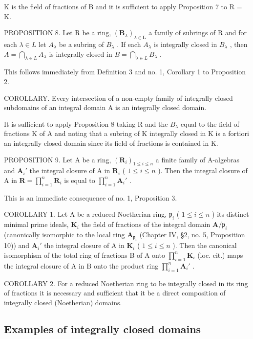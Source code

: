 K is the field of fractions of B and it is sufficient to apply Proposition 7 to R = K.

PROPOSITION 8. Let R be a ring, \((\mathbf{B}_{\lambda})_{\lambda \in \mathbf{L}}\) a family of subrings of R and for each \(\lambda \in L\) let \(A_{\lambda}\) be a subring of \(B_{\lambda}\) . If each \(A_{\lambda}\) is integrally closed in \(B_{\lambda}\) , then \(A = \bigcap_{\lambda \in L} A_{\lambda}\) is integrally closed in \(B = \bigcap_{\lambda \in L} B_{\lambda}\) .

This follows immediately from Definition 3 and no. 1, Corollary 1 to Proposition 2.

COROLLARY. Every intersection of a non-empty family of integrally closed subdomains of an integral domain A is an integrally closed domain.

It is sufficient to apply Proposition 8 taking R and the \(B_{\lambda}\) equal to the field of fractions K of A and noting that a subring of K integrally closed in K is a fortiori an integrally closed domain since its field of fractions is contained in K.

PROPOSITION 9. Let A be a ring, \((\mathbf{R}_i)_{1 \leqslant i \leqslant n}\) a finite family of A-algebras and \(\mathbf{A}_i'\) the integral closure of A in \(\mathbf{R}_i\) ( \(1 \leqslant i \leqslant n\) ). Then the integral closure of A in \(\mathbf{R} = \prod_{i=1}^{n} \mathbf{R}_i\) is equal to \(\prod_{i=1}^{n} \mathbf{A}_i'\) .

This is an immediate consequence of no. 1, Proposition 3.

COROLLARY 1. Let A be a reduced Noetherian ring, \(\mathfrak{p}_i\) ( \(1 \leqslant i \leqslant n\) ) its distinct minimal prime ideals, \(\mathbf{K}_i\) the field of fractions of the integral domain \(\mathbf{A} / \mathfrak{p}_i\) (canonically isomorphic to the local ring \(\mathbf{A}_{\mathfrak{p}_i}\) (Chapter IV, §2, no. 5, Proposition 10)) and \(\mathbf{A}_i'\) the integral closure of A in \(\mathbf{K}_i\) ( \(1 \leqslant i \leqslant n\) ). Then the canonical isomorphism of the total ring of fractions B of A onto \(\prod_{i=1}^{n} \mathbf{K}_i\) (loc. cit.) maps the integral closure of A in B onto the product ring \(\prod_{i=1}^{n} \mathbf{A}_i'\) .

COROLLARY 2. For a reduced Noetherian ring to be integrally closed in its ring of fractions it is necessary and sufficient that it be a direct composition of integrally closed (Noetherian) domains.

\subsection{Examples of integrally closed domains}

